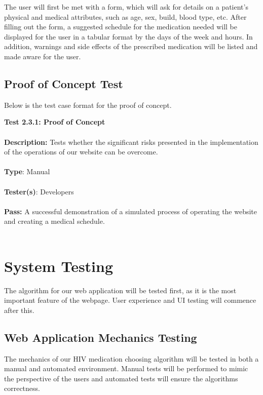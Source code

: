 \documentclass[12pt]{article}
\begin{document}
The user will first be met with a form, which will ask for details on a patient’s physical and medical attributes, such as age, sex, build, blood type, etc. After filling out the form,  a suggested schedule for the medication needed will be displayed for the user in a tabular format by the days of the week and hours. In addition, warnings and side effects of the prescribed medication will be listed and made aware for the user.

\subsection{Proof of Concept Test}
Below is the test case format for the proof of concept.

\begin{tcolorbox}
\textbf{Test 2.3.1: Proof of Concept} \\ \\
\textbf{Description:} Tests whether the significant risks presented in the implementation of the operations of our website can be overcome. \\ \\
\textbf{Type}: Manual \\ \\
\textbf{Tester(s)}: Developers \\ \\
\textbf{Pass:} A successful demonstration of a simulated process of operating the website and creating a medical schedule. \\ \\
\end{tcolorbox}

\section{System Testing}
The algorithm for our web application will be tested first, as it is the most important feature of the webpage. User experience and UI testing will commence after this.

\subsection{Web Application Mechanics Testing}
The mechanics of our HIV medication choosing algorithm will be tested in both a manual and automated environment. Manual tests will be performed to mimic the perspective of the users and automated tests will ensure the algorithm\textquotesingle s correctness.
\end{document}
